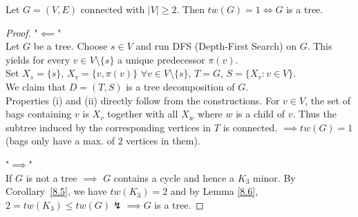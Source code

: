 \begin{lemma}\label{8.7}
    Let $G=(V,E)$ connected with $|V|\geq 2$. Then $tw(G)=1\iff G$ is a tree.
\end{lemma}
\begin{proof}
    "$\impliedby$"\\
    Let $G$ be a tree. Choose $s\in V$ and run DFS (Depth-First Search) on $G$. This yields for every $v\in V\setminus\{s\}$ a unique predecessor $\pi(v)$.\\
    Set $X_s=\{s\}$, $X_v=\{v,\pi(v)\}$ $\forall v\in V\setminus\{s\}$, $T=G$, $S=\{X_v:v\in V\}$.\\
    We claim that $D=(T,S)$ is a tree decomposition of $G$.\\
    Properties (i) and (ii) directly follow from the constructions. For $v\in V$, the set of bags containing $v$ is $X_v$ together with all $X_w$ where $w$ is a child of $v$. Thus the subtree induced by the corresponding vertices in $T$ is connected. $\implies tw(G)=1$ (bags only have a max. of $2$ vertices in them).
     
 \begin{center}
    \end{center}
    "$\implies$"\\
    If $G$ is not a tree $\implies$ $G$ contains a cycle and hence a $K_3$ minor. By Corollary~\ref{8.5}, we have $tw(K_3)=2$ and by Lemma \ref{8.6}, $2=tw(K_3)\leq tw(G)\lightning\implies G$ is a tree.
\end{proof}
